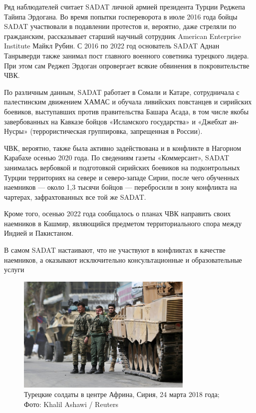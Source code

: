 Ряд наблюдателей считает SADAT личной армией президента Турции Реджепа Тайипа Эрдогана. Во время попытки госпереворота в июле 2016 года бойцы SADAT участвовали в подавлении протестов и, вероятно, даже стреляли по гражданским, рассказывает старший научный сотрудник American Enterprise Institute Майкл Рубин. С 2016 по 2022 год основатель SADAT Аднан Танрыверди также занимал пост главного военного советника турецкого лидера. При этом сам Реджеп Эрдоган опровергает всякие обвинения в покровительстве ЧВК.

По различным данным, SADAT работает в Сомали и Катаре, сотрудничала с палестинским движением ХАМАС и обучала ливийских повстанцев и сирийских боевиков, выступавших против правительства Башара Асада, в том числе якобы завербованных на Кавказе бойцов «Исламского государства» и «Джебхат ан-Нусры» (террористическая группировка, запрещенная в России).

ЧВК, вероятно, также была активно задействована и в конфликте в Нагорном Карабахе осенью 2020 года. По сведениям газеты «Коммерсант», SADAT занималась вербовкой и подготовкой сирийских боевиков на подконтрольных Турции территориях на севере и северо-западе Сирии, после чего обученных наемников — около 1,3 тысячи бойцов — перебросили в зону конфликта на чартерах, зафрахтованных все той же SADAT.

Кроме того, осенью 2022 года сообщалось о планах ЧВК направить своих наемников в Кашмир, являющийся предметом территориального спора между Индией и Пакистаном.

\begin{center}
    \Large
    В самом SADAT настаивают, что не участвуют в конфликтах в качестве наемников, а оказывают исключительно консультационные и образовательные услуги
\end{center}


\begin{figure}[h]
    \centering
    \includegraphics[width=0.75\textwidth]{img/pmc_africa_8.jpg}
    \caption{Турецкие солдаты в центре Африна, Сирия, 24 марта 2018 года; Фото: Khalil Ashawi / Reuters}
\end{figure}

